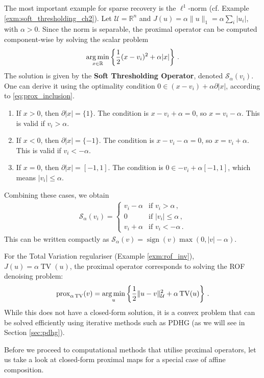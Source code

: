 \begin{exm}\label{exm:soft_thresholding}\normalfont
The most important example for sparse recovery is the $\ell^1$-norm (cf. Example \ref{exm:soft_thresholding_ch2}). Let $\mathcal{U} = \mathbb{R}^n$ and $J(u) = \alpha \|u\|_1 = \alpha \sum_i |u_i|$, with $\alpha > 0$. Since the norm is separable, the proximal operator can be computed component-wise by solving the scalar problem
\begin{align*}
\operatorname*{arg\,min}_{x \in \mathbb{R}} \left\{ \frac12 (x - v_i)^2 + \alpha |x| \right\} \, .
\end{align*}
The solution is given by the \textbf{Soft Thresholding Operator}, denoted $\mathcal{S}_\alpha(v_i)$. One can derive it using the optimality condition $0 \in (x - v_i) + \alpha \partial |x|$, according to \eqref{eq:prox_inclusion}.
\begin{enumerate}
\item If $x > 0$, then $\partial |x| = \{1\}$. The condition is $x - v_i + \alpha = 0$, so $x = v_i - \alpha$. This is valid if $v_i > \alpha$.
\item If $x < 0$, then $\partial |x| = \{-1\}$. The condition is $x - v_i - \alpha = 0$, so $x = v_i + \alpha$. This is valid if $v_i < -\alpha$.
\item If $x = 0$, then $\partial |x| = [-1, 1]$. The condition is $0 \in -v_i + \alpha [-1, 1]$, which means $|v_i| \leq \alpha$.
\end{enumerate}
Combining these cases, we obtain
\begin{align*}
\mathcal{S}_\alpha(v_i) = \begin{cases} v_i - \alpha & \text{if } v_i > \alpha \, , \\ 0 & \text{if } |v_i| \leq \alpha \, , \\ v_i + \alpha & \text{if } v_i < -\alpha \, . \end{cases}
\end{align*}
This can be written compactly as $\mathcal{S}_\alpha(v) = \operatorname{sign}(v) \max(0, |v| - \alpha)$.
\end{exm}

\begin{exm}\normalfont
For the Total Variation regulariser (Example \ref{exm:rof_inv}), $J(u) = \alpha \operatorname{TV}(u)$, the proximal operator corresponds to solving the ROF denoising problem:
\begin{align*}
\operatorname{prox}_{\alpha\operatorname{TV}}(v) = \operatorname*{arg\,min}_{u} \left\{ \frac12 \|u - v\|_{\mathcal{U}}^2 + \alpha \operatorname{TV}(u) \right\} \, .
\end{align*}
While this does not have a closed-form solution, it is a convex problem that can be solved efficiently using iterative methods such as PDHG (as we will see in Section \ref{sec:pdhg}).
\end{exm}
Before we proceed to computational methods that utilise proximal operators, let us take a look at closed-form proximal maps for a special case of affine composition.

